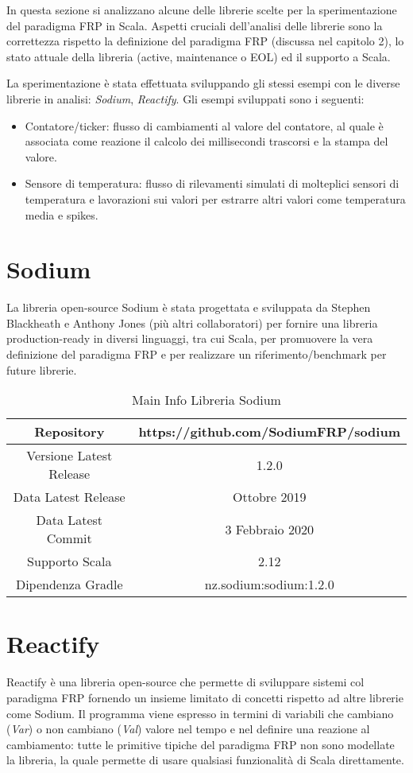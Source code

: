 \documentclass[../main.tex]{subfiles}
\begin{document}
In questa sezione si analizzano alcune delle librerie scelte per la sperimentazione del paradigma FRP in Scala. Aspetti cruciali dell'analisi delle librerie sono la correttezza rispetto la definizione del paradigma FRP (discussa nel capitolo 2), lo stato attuale della libreria (active, maintenance o EOL) ed il supporto a Scala.

La sperimentazione è stata effettuata sviluppando gli stessi esempi con le diverse librerie in analisi: \textit{Sodium}, \textit{Reactify}. Gli esempi sviluppati sono i seguenti:
\begin{itemize}
    \item Contatore/ticker: flusso di cambiamenti al valore del contatore, al quale è associata come reazione il calcolo dei millisecondi trascorsi e la stampa del valore.
    \item Sensore di temperatura: flusso di rilevamenti simulati di molteplici sensori di temperatura e lavorazioni sui valori per estrarre altri valori come temperatura media e spikes.
\end{itemize}

\section{Sodium}
La libreria open-source Sodium è stata progettata e sviluppata da Stephen Blackheath e Anthony Jones (più altri collaboratori) per fornire una libreria production-ready in diversi linguaggi, tra cui Scala, per promuovere la vera definizione del paradigma FRP e per realizzare un riferimento/benchmark per future librerie.

\begin{table}[H]
\centering
\begin{tabular}{|c|c|}
     \hline
     Repository & https://github.com/SodiumFRP/sodium \\
     \hline
     Versione Latest Release & 1.2.0 \\
     \hline
     Data Latest Release & Ottobre 2019 \\
     \hline
     Data Latest Commit & 3 Febbraio 2020 \\
     \hline
     Supporto Scala & 2.12 \\
     \hline
     Dipendenza Gradle & nz.sodium:sodium:1.2.0 \\
     \hline
\end{tabular}
\caption{Main Info Libreria Sodium}
\end{table}

\section{Reactify}
Reactify è una libreria open-source che permette di sviluppare sistemi col paradigma FRP fornendo un insieme limitato di concetti rispetto ad altre librerie come Sodium. Il programma viene espresso in termini di variabili che cambiano (\textit{Var}) o non cambiano (\textit{Val}) valore nel tempo e nel definire una reazione al cambiamento: tutte le primitive tipiche del paradigma FRP non sono modellate la libreria, la quale permette di usare qualsiasi funzionalità di Scala direttamente.
\end{document}
